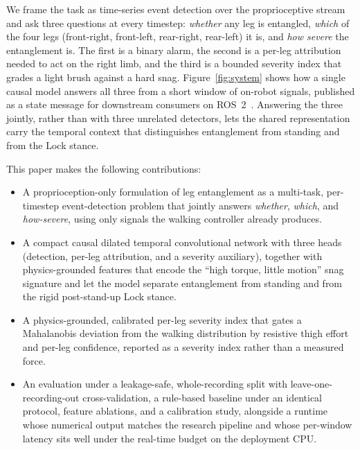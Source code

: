 We frame the task as time-series event detection over the proprioceptive stream and ask three questions at every timestep: \emph{whether} any leg is entangled, \emph{which} of the four legs (front-right, front-left, rear-right, rear-left) it is, and \emph{how severe} the entanglement is. The first is a binary alarm, the second is a per-leg attribution needed to act on the right limb, and the third is a bounded severity index that grades a light brush against a hard snag. Figure~\ref{fig:system} shows how a single causal model answers all three from a short window of on-robot signals, published as a state message for downstream consumers on ROS~2~\cite{macenski2022ros2}. Answering the three jointly, rather than with three unrelated detectors, lets the shared representation carry the temporal context that distinguishes entanglement from standing and from the Lock stance.

This paper makes the following contributions:
\begin{itemize}
  \item A proprioception-only formulation of leg entanglement as a multi-task, per-timestep event-detection problem that jointly answers \emph{whether}, \emph{which}, and \emph{how-severe}, using only signals the walking controller already produces.
  \item A compact causal dilated temporal convolutional network with three heads (detection, per-leg attribution, and a severity auxiliary), together with physics-grounded features that encode the ``high torque, little motion'' snag signature and let the model separate entanglement from standing and from the rigid post-stand-up Lock stance.
  \item A physics-grounded, calibrated per-leg severity index that gates a Mahalanobis deviation from the walking distribution by resistive thigh effort and per-leg confidence, reported as a severity index rather than a measured force.
  \item An evaluation under a leakage-safe, whole-recording split with leave-one-recording-out cross-validation, a rule-based baseline under an identical protocol, feature ablations, and a calibration study, alongside a runtime whose numerical output matches the research pipeline and whose per-window latency sits well under the real-time budget on the deployment CPU.
\end{itemize}